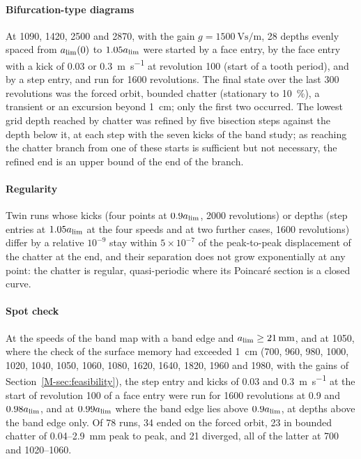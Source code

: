 \paragraph{Bifurcation-type diagrams} At 1090, 1420, 2500 and \SI{2870}{\rpm}, with the gain $g=\SI{1500}{\volt\second\per\metre}$, 28 depths evenly spaced from $a_{\lim}(0)$ to $1.05a_{\lim}$ were started by a face entry, by the face entry with a kick of 0.03 or \SI{0.3}{\metre\per\second} at revolution 100 (start of a tooth period), and by a step entry, and run for 1600 revolutions. The final state over the last 300 revolutions was the forced orbit, bounded chatter (stationary to \SI{10}{\percent}), a transient or an excursion beyond \SI{1}{\centi\metre}; only the first two occurred. The lowest grid depth reached by chatter was refined by five bisection steps against the depth below it, at each step with the seven kicks of the band study; as reaching the chatter branch from one of these starts is sufficient but not necessary, the refined end is an upper bound of the end of the branch.

\paragraph{Regularity} Twin runs whose kicks (four points at $0.9a_{\lim}$, 2000 revolutions) or depths (step entries at $1.05a_{\lim}$ at the four speeds and at two further cases, 1600 revolutions) differ by a relative $10^{-9}$ stay within $5\times10^{-7}$ of the peak-to-peak displacement of the chatter at the end, and their separation does not grow exponentially at any point: the chatter is regular, quasi-periodic where its Poincar\'e section is a closed curve.

\paragraph{Spot check} At the speeds of the band map with a band edge and $a_{\lim}\ge\SI{21}{\milli\metre}$, and at \SI{1050}{\rpm}, where the check of the surface memory had exceeded \SI{1}{\centi\metre} (700, 960, 980, 1000, 1020, 1040, 1050, 1060, 1080, 1620, 1640, 1820, 1960 and \SI{1980}{\rpm}, with the gains of Section~\ref{M-sec:feasibility}), the step entry and kicks of 0.03 and \SI{0.3}{\metre\per\second} at the start of revolution 100 of a face entry were run for 1600 revolutions at 0.9 and $0.98a_{\lim}$, and at $0.99a_{\lim}$ where the band edge lies above $0.9a_{\lim}$, at depths above the band edge only. Of 78 runs, 34 ended on the forced orbit, 23 in bounded chatter of 0.04--\SI{2.9}{\milli\metre} peak to peak, and 21 diverged, all of the latter at 700 and 1020--\SI{1060}{\rpm}.

